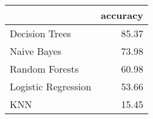 \begin{tabular}{lr}
\toprule
{} &  accuracy \\
\midrule
Decision Trees      &     85.37 \\
Naive Bayes         &     73.98 \\
Random Forests      &     60.98 \\
Logistic Regression &     53.66 \\
KNN                 &     15.45 \\
\bottomrule
\end{tabular}

